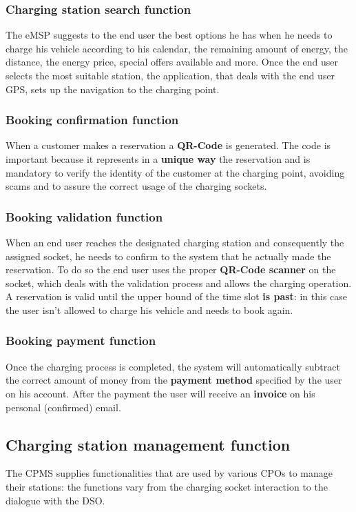 \subsubsection{Charging station search function}
The eMSP suggests to the end user the best options he has when he needs to charge his vehicle according to his calendar, the remaining amount of energy, the distance, the energy price, special offers available and more. Once the end user selects the most suitable station, the application, that deals with the end user GPS, sets up the navigation to the charging point.
\subsubsection{Booking confirmation function}
When a customer makes a reservation a \textbf{QR-Code} is generated. The code is important because it represents in a \textbf{unique way} the reservation and is mandatory to verify the identity of the customer at the charging point, avoiding scams and to assure the correct usage of the charging sockets.
\subsubsection{Booking validation function}
When an end user reaches the designated charging station and consequently the assigned socket, he needs to confirm to the system that he actually made the reservation. To do so the end user uses the proper \textbf{QR-Code scanner} on the socket, which deals with the validation process and allows the charging operation. A reservation is valid until the upper bound of the time slot \textbf{is past}: in this case the user isn't allowed to charge his vehicle and needs to book again.
\subsubsection{Booking payment function}
Once the charging process is completed, the system will automatically subtract the correct amount of money from the \textbf{payment method} specified by the user on his account. After the payment the user will receive an \textbf{invoice} on his personal (confirmed) email.
\subsection{Charging station management function}
The CPMS supplies functionalities that are used by various CPOs to manage their stations: the functions vary from the charging socket interaction to the dialogue with the DSO.
